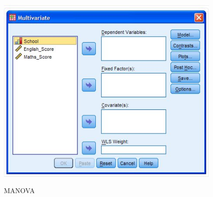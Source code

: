 \documentclass[a4paper,12pt]{article}
\begin{document}
\begin{center}
	\begin{figure}[h!]
		\includegraphics[scale=0.4]{MANOVA1}\\
		\caption{MANOVA}
	\end{figure}
\end{center}
\end{document}
